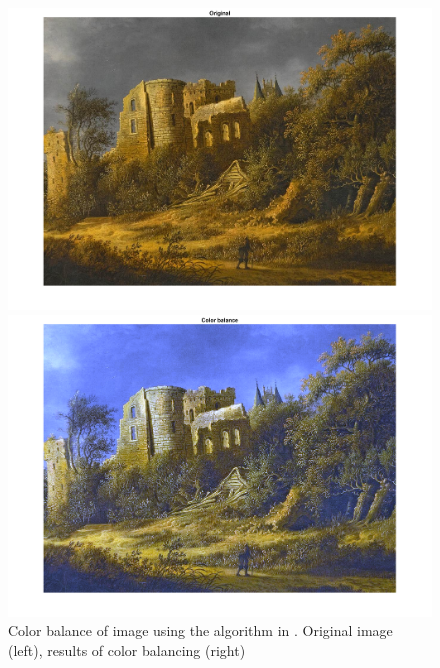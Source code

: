 \documentclass[conference]{IEEEtran}
\begin{document}
\begin{figure}[ht]
\begin{multicols}{2}
    \includegraphics[width=\linewidth]{colbal11.png}\par 
    \includegraphics[width=\linewidth]{colbal12.png}\par 
    \end{multicols}
\caption{Color balance of image using the algorithm in \cite{colbal}. Original image (left), results of color balancing (right)}
\label{colbal_1}
\end{figure}
\end{document}
